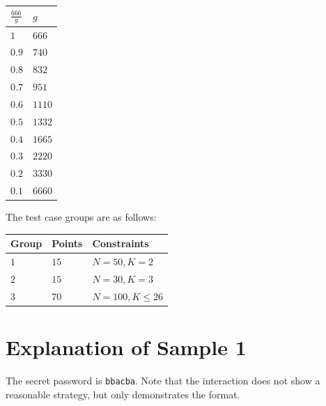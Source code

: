 \begin{center}
  \noindent
  \begin{tabular}{| l | l |}
    \hline
    $\frac{666}{g}$ & $g$ \\ \hline
    $1$             & $666$ \\ \hline
    $0.9$           & $740$ \\ \hline
    $0.8$           & $832$ \\ \hline
    $0.7$           & $951$ \\ \hline
    $0.6$           & $1110$ \\ \hline
    $0.5$           & $1332$ \\ \hline
    $0.4$           & $1665$ \\ \hline
    $0.3$           & $2220$ \\ \hline
    $0.2$           & $3330$ \\ \hline
    $0.1$           & $6660$ \\ \hline
  \end{tabular}
\end{center}
  
The test case groups are as follows:

\noindent
\begin{tabular}{| l | l | p{12cm} |}
  \hline
  \textbf{Group} & \textbf{Points} & \textbf{Constraints} \\ \hline
  $1$    & $15$       & $N = 50, K = 2$ \\ \hline
  $2$    & $15$       & $N = 30, K = 3$ \\ \hline
  $3$    & $70$       & $N = 100, K \leq 26$ \\ \hline
\end{tabular}

\section*{Explanation of Sample 1}
The secret password is \texttt{bbacba}. Note that the interaction does not show a reasonable strategy,
but only demonstrates the format.
